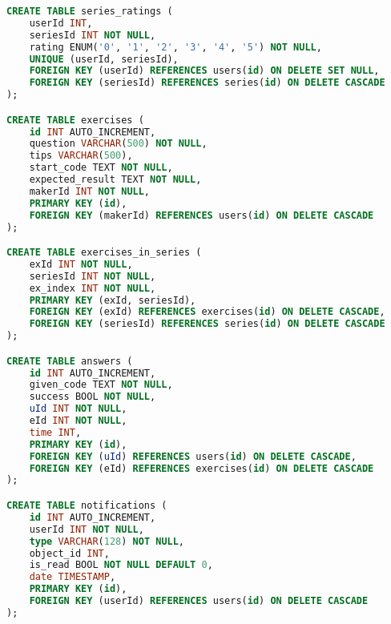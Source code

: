 \begin{lstlisting}[language=sql]
CREATE TABLE series_ratings (
    userId INT,
    seriesId INT NOT NULL,
    rating ENUM('0', '1', '2', '3', '4', '5') NOT NULL,
    UNIQUE (userId, seriesId),
    FOREIGN KEY (userId) REFERENCES users(id) ON DELETE SET NULL,
    FOREIGN KEY (seriesId) REFERENCES series(id) ON DELETE CASCADE
);

CREATE TABLE exercises (
    id INT AUTO_INCREMENT,
    question VARCHAR(500) NOT NULL,
    tips VARCHAR(500),
    start_code TEXT NOT NULL,
    expected_result TEXT NOT NULL,
    makerId INT NOT NULL,
    PRIMARY KEY (id),
    FOREIGN KEY (makerId) REFERENCES users(id) ON DELETE CASCADE
);

CREATE TABLE exercises_in_series (
    exId INT NOT NULL,
    seriesId INT NOT NULL,
    ex_index INT NOT NULL,
    PRIMARY KEY (exId, seriesId),
    FOREIGN KEY (exId) REFERENCES exercises(id) ON DELETE CASCADE,
    FOREIGN KEY (seriesId) REFERENCES series(id) ON DELETE CASCADE
);

CREATE TABLE answers (
    id INT AUTO_INCREMENT,
    given_code TEXT NOT NULL,
    success BOOL NOT NULL,
    uId INT NOT NULL,
    eId INT NOT NULL,
    time INT,
    PRIMARY KEY (id),
    FOREIGN KEY (uId) REFERENCES users(id) ON DELETE CASCADE,
    FOREIGN KEY (eId) REFERENCES exercises(id) ON DELETE CASCADE
);

CREATE TABLE notifications (
    id INT AUTO_INCREMENT,
    userId INT NOT NULL,
    type VARCHAR(128) NOT NULL,
    object_id INT,
    is_read BOOL NOT NULL DEFAULT 0,
    date TIMESTAMP,
    PRIMARY KEY (id),
    FOREIGN KEY (userId) REFERENCES users(id) ON DELETE CASCADE
);
\end{lstlisting}    
